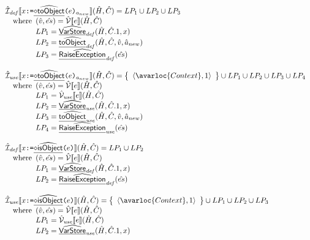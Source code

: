 \[
\begin{array}{l}
  \\\\
  \aI_{\it def}\lbr x \TT{:=} \ahfi{toObject}\TT{(}e\TT{)}_{a_{new}} \rbr(\hat{H},\hat{C})
  = LP_1 \cup LP_2\cup LP_3\\
  \quad\wherec{
    (\hat{v},\hat{es}) = \aV\lbr e\rbr(\hat{H},\hat{C})\\
    LP_1 = \ahf{VarStore}_{\it def}(\hat{H},\hat{C}.1,x)\\
    LP_2 = \ahf{toObject}_{\it def}(\hat{H},\hat{C},\hat{v},\hat{a}_{new})\\
    LP_3 = \ahf{RaiseException}_{\it def}(\hat{es})
  }
  \\\\
  \aI_{\it use}\lbr x \TT{:=} \ahfi{toObject}\TT{(}e\TT{)}_{a_{new}} \rbr(\hat{H},\hat{C})
  = \set{\langle \avarloc{Context}, 1\rangle} \cup LP_1 \cup LP_2 \cup LP_3 \cup LP_4\\
  \quad\wherec{
    (\hat{v},\hat{es}) = \aV\lbr e\rbr(\hat{H},\hat{C})\\
    LP_1 = \aV_{\it use}\lbr e\rbr(\hat{H},\hat{C})\\
    LP_2 = \ahf{VarStore}_{\it use}(\hat{H},\hat{C}.1,x)\\
    LP_3 = \ahf{toObject}_{\it use}(\hat{H},\hat{C},\hat{v}, \hat{a}_{new})\\
    LP_4 = \ahf{RaiseException}_{\it use}(\hat{es})\\
  }
  \\\\
  \aI_{\it def}\lbr x \TT{:=} \ahfi{isObject}\TT{(}e\TT{)} \rbr(\hat{H},\hat{C})
  = LP_1 \cup LP_2\\
  \quad\wherec{
    (\hat{v},\hat{es}) = \aV\lbr e\rbr(\hat{H},\hat{C})\\
    LP_1 = \ahf{VarStore}_{\it def}(\hat{H},\hat{C}.1,x)\\
    LP_2 = \ahf{RaiseException}_{\it def}(\hat{es})
  }
  \\\\
  \aI_{\it use}\lbr x \TT{:=} \ahfi{isObject}\TT{(}e\TT{)} \rbr(\hat{H},\hat{C})
  = \set{\langle \avarloc{Context}, 1\rangle} \cup LP_1 \cup LP_2 \cup LP_3\\
  \quad\wherec{
    (\hat{v},\hat{es}) = \aV\lbr e\rbr(\hat{H},\hat{C})\\
    LP_1 = \aV_{\it use}\lbr e\rbr(\hat{H},\hat{C})\\
    LP_2 = \ahf{VarStore}_{\it use}(\hat{H},\hat{C}.1,x)\\
}
\end{array}\]
